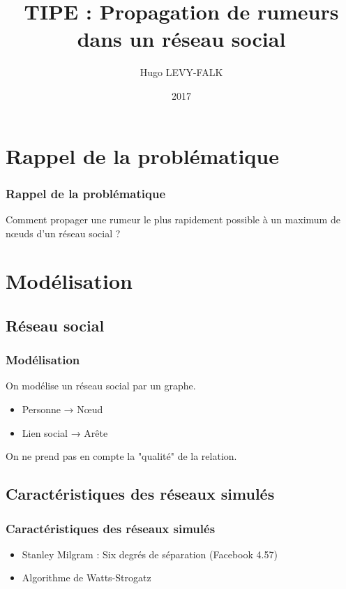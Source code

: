 \documentclass{beamer}
\title[Propagation de rumeurs dans un réseau social]{TIPE : Propagation de rumeurs dans un réseau social}
\author{Hugo LEVY-FALK}
\date{2017}
\begin{document}
\begin{frame}
  \titlepage
\end{frame}

\section{Rappel de la problématique}
\begin{frame}
  \frametitle{Rappel de la problématique}
  \begin{center}
  Comment propager une rumeur le plus rapidement possible à un maximum de nœuds d'un réseau social ?
  \end{center}
\end{frame}

\section{Modélisation}
\subsection{Réseau social}
\begin{frame}
  \frametitle{Modélisation}
  On modélise un réseau social par un graphe.
  \begin{itemize}
    \item Personne → Nœud
    \item Lien social → Arête
  \end{itemize}
    \begin{alertblock}{}
    \begin{center}
      On ne prend pas en compte la "qualité" de la relation.
    \end{center}
    \end{alertblock}
\end{frame}
\subsection{Caractéristiques des réseaux simulés}
\begin{frame}
  \frametitle{Caractéristiques des réseaux simulés}
  \begin{itemize}
    \item Stanley Milgram : Six degrés de séparation (Facebook 4.57)
    \item Algorithme de Watts-Strogatz
  \end{itemize}
\end{frame}
\end{document}

